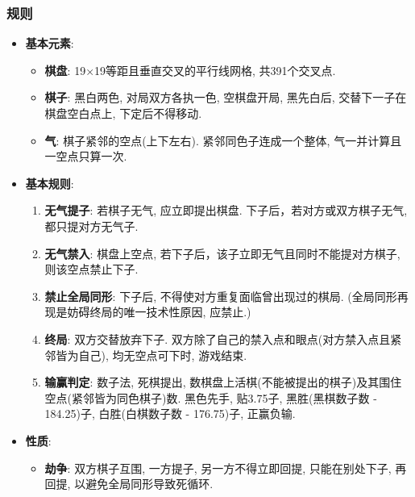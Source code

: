 \documentclass{article}
\newcommand{\env}[2]{\begin{#1}#2\end{#1}}
\begin{document}
        \subsubsection{规则}
            \env{itemize}{
            \item  \textbf{基本元素}:
                \env{itemize}{
                    \item \textbf{棋盘}: 19×19等距且垂直交叉的平行线网格, 共391个交叉点.
                    \item \textbf{棋子}: 黑白两色, 对局双方各执一色, 空棋盘开局, 黑先白后, 交替下一子在棋盘空白点上, 下定后不得移动.
                    \item \textbf{气}: 棋子紧邻的空点(上下左右). 紧邻同色子连成一个整体, 气一并计算且一空点只算一次.
                }
            
            \item  \textbf{基本规则}:
                \env{enumerate}{
                    \item \textbf{无气提子}: 若棋子无气, 应立即提出棋盘. 下子后，若对方或双方棋子无气, 都只提对方无气子.
                    \item \textbf{无气禁入}: 棋盘上空点, 若下子后，该子立即无气且同时不能提对方棋子, 则该空点禁止下子.
                    \item \textbf{禁止全局同形}: 下子后, 不得使对方重复面临曾出现过的棋局. (全局同形再现是妨碍终局的唯一技术性原因, 应禁止.)
                    \item \textbf{终局}: 双方交替放弃下子. 双方除了自己的禁入点和眼点(对方禁入点且紧邻皆为自己), 均无空点可下时, 游戏结束.
                    \item \textbf{输赢判定}: 数子法, 死棋提出, 数棋盘上活棋(不能被提出的棋子)及其围住空点(紧邻皆为同色棋子)数. 黑色先手, 贴3.75子, 黑胜(黑棋数子数 - 184.25)子, 白胜(白棋数子数 - 176.75)子, 正赢负输.
                }
                
            \item \textbf{性质}:
                \env{itemize}{
                    \item \textbf{劫争}: 双方棋子互围, 一方提子, 另一方不得立即回提, 只能在别处下子, 再回提, 以避免全局同形导致死循环.
                }
            }
\end{document}
